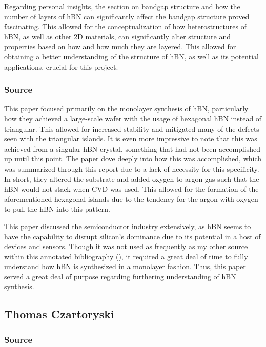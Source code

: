 \documentclass[conference]{IEEEtran}
\begin{document}
Regarding personal insights, the section on bandgap structure and how the number of layers of hBN can significantly affect the bandgap structure proved fascinating. This allowed for the conceptualization of how heterostructures of hBN, as well as other 2D materials, can significantly alter structure and properties based on how and how much they are layered. This allowed for obtaining a better understanding of the structure of hBN, as well as its potential applications, crucial for this project.

\subsubsection{Source \cite{jb2}}

This paper focused primarily on the monolayer synthesis of hBN, particularly how they achieved a large-scale wafer with the usage of hexagonal hBN instead of triangular. This allowed for increased stability and mitigated many of the defects seen with the triangular islands. It is even more impressive to note that this was achieved from a singular hBN crystal, something that had not been accomplished up until this point. The paper dove deeply into how this was accomplished, which was summarized through this report due to a lack of necessity for this specificity. In short, they altered the substrate and added oxygen to argon gas such that the hBN would not stack when CVD was used. This allowed for the formation of the aforementioned hexagonal islands due to the tendency for the argon with oxygen to pull the hBN into this pattern.

This paper discussed the semiconductor industry extensively, as hBN seems to have the capability to disrupt silicon’s dominance due to its potential in a host of devices and sensors. Though it was not used as frequently as my other source within this annotated bibliography (\cite{jb1}), it required a great deal of time to fully understand how hBN is synthesized in a monolayer fashion. Thus, this paper served a great deal of purpose regarding furthering understanding of hBN synthesis.

\subsection{Thomas Czartoryski}

\subsubsection{Source \cite{tc6}}
\end{document}
